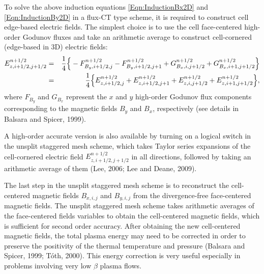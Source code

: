 To solve the above induction equations
\eqref{Eqn:InductionBx2D} and \eqref{Eqn:InductionBy2D} in a flux-CT
type scheme, it is required to construct cell edge-based electric fields.
The simplest choice is to use the cell face-centered high-order Godunov
fluxes and take an arithmetic average to construct cell-cornered
(edge-based in 3D) electric fields:
\begin{eqnarray}
{E}^{n+1/2}_{z,i+{1}/{2},j+{1}/{2}}&=&\nonumber
\frac{1}{4}\Bigr\{-F^{n+{1}/{2}}_{B_y,i+{1}/{2},j}-
                   F^{n+{1}/{2}}_{B_y,i+{1}/{2},j+1} +
                   G^{n+{1}/{2}}_{B_x,i,j+{1}/{2}}+
                   G^{n+{1}/{2}}_{B_x,i+1,j+{1}/{2}} \Bigl\}\\
&=&\frac{1}{4}\Bigr\{E^{n+{1}/{2}}_{z,i+{1}/{2},j}+
                     E^{n+{1}/{2}}_{z,i+{1}/{2},j+1}+
             E^{n+{1}/{2}}_{z,i,j+{1}/{2}}+
             E^{n+{1}/{2}}_{z,i+1,j+{1}/{2}} \Bigl\},
\label{Eqn:BalsaraEz}
\end{eqnarray}
where $F_{B_y}$ and $G_{B_x}$ represent the $x$ and $y$ high-order
Godunov flux components corresponding to the magnetic fields
$B_y$ and $B_x$, respectively (see details in Balsara and Spicer, 1999).

A high-order accurate version is also available by turning on
a logical switch  in the unsplit staggered mesh scheme, which takes
Taylor series expansions of the cell-cornered electric field
${E}^{n+1/2}_{z,i+{1}/{2},j+{1}/{2}}$
in all directions, followed by taking an arithmetic average of them (Lee, 2006; Lee and Deane, 2009).

The last step in the unsplit staggered mesh scheme is to reconstruct the cell-centered magnetic fields
$B_{x,i,j}$ and $B_{y,i,j}$ from the divergence-free face-centered magnetic fields.
The unsplit staggered mesh scheme takes arithmetic averages of the face-centered fields variables to obtain
the cell-centered magnetic fields, which is sufficient for second order accuracy.
After obtaining the new cell-centered magnetic fields, the total plasma energy
may need to be corrected in order to preserve the positivity of
the thermal temperature and pressure (Balsara and Spicer, 1999; T\'{o}th, 2000).
This energy correction is very useful especially in problems involving very
low $\beta$ plasma flows.

